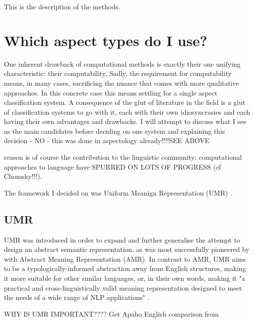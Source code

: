 This is the description of the methods. 

\section{Which aspect types do I use?}
One inherent drawback of computational methods is exactly their one unifying characteristic: their computability. Sadly, the requirement for computability means, in many cases, sacrificing the nuance that comes with more qualitative approaches. In this concrete case this means settling for a single aspect classification system. A consequence of the glut of literature in the field is a glut of classification systems to go with it, each with their own idiosyncrasies and each having their own advantages and drawbacks. I will attempt to discuss what I see as the main candidates before deciding on one system and explaining this decision - NO - this was done in aspectology already!!!!SEE ABOVE

reason is of course the contribution to the linguistic community: computational approaches to language have SPURRED ON LOTS OF PROGRESS (cf Chomsky!!!). 

The framework I decided on was Uniform Meanign Representation (UMR) \citep{umr}.

\subsection{UMR}
UMR \citep{umr} was introduced in order to expand and further generalise the attempt to design an abstract semantic representation, as was most successfully pioneered by \citet{amr} with Abstract Meaning Representation (AMR). In contrast to AMR, UMR aims to be a typologically-informed abstraction away from English structures, making it more suitable for other similar languages, or, in their own words, making it "a practical and cross-linguistically valid meaning representation designed to meet the needs of a wide range of NLP applications" \citep{umr}.

WHY IS UMR IMPORTANT???? Get Apaho English comparison from \citet{bonn-etal-2023-mapping}

